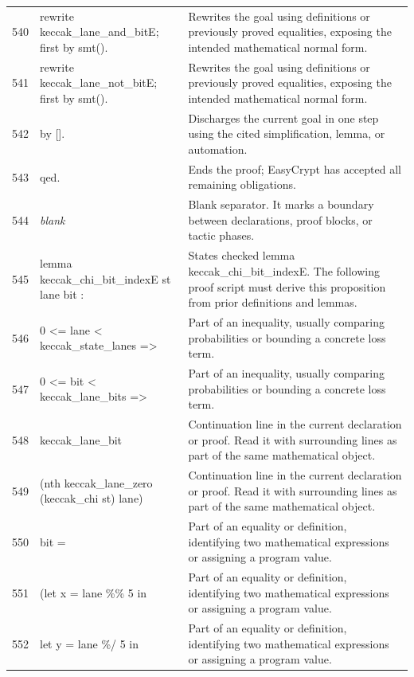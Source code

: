 \documentclass[10pt]{article}
\begin{document}
\begin{longtable}{r L{0.53\textwidth} L{0.37\textwidth}}
540 & {\ttfamily\scriptsize rewrite keccak\_lane\_and\_bitE; first by smt().} & Rewrites the goal using definitions or previously proved equalities, exposing the intended mathematical normal form. \\
541 & {\ttfamily\scriptsize rewrite keccak\_lane\_not\_bitE; first by smt().} & Rewrites the goal using definitions or previously proved equalities, exposing the intended mathematical normal form. \\
542 & {\ttfamily\scriptsize by [].} & Discharges the current goal in one step using the cited simplification, lemma, or automation. \\
543 & {\ttfamily\scriptsize qed.} & Ends the proof; EasyCrypt has accepted all remaining obligations. \\
544 & {\ttfamily\scriptsize \emph{blank}} & Blank separator.  It marks a boundary between declarations, proof blocks, or tactic phases. \\
545 & {\ttfamily\scriptsize lemma keccak\_chi\_bit\_indexE st lane bit :} & States checked lemma keccak\_chi\_bit\_indexE.  The following proof script must derive this proposition from prior definitions and lemmas. \\
546 & {\ttfamily\scriptsize   0 <= lane < keccak\_state\_lanes =>} & Part of an inequality, usually comparing probabilities or bounding a concrete loss term. \\
547 & {\ttfamily\scriptsize   0 <= bit < keccak\_lane\_bits =>} & Part of an inequality, usually comparing probabilities or bounding a concrete loss term. \\
548 & {\ttfamily\scriptsize   keccak\_lane\_bit} & Continuation line in the current declaration or proof.  Read it with surrounding lines as part of the same mathematical object. \\
549 & {\ttfamily\scriptsize     (nth keccak\_lane\_zero (keccak\_chi st) lane)} & Continuation line in the current declaration or proof.  Read it with surrounding lines as part of the same mathematical object. \\
550 & {\ttfamily\scriptsize     bit =} & Part of an equality or definition, identifying two mathematical expressions or assigning a program value. \\
551 & {\ttfamily\scriptsize   (let x = lane \%\% 5 in} & Part of an equality or definition, identifying two mathematical expressions or assigning a program value. \\
552 & {\ttfamily\scriptsize    let y = lane \%/ 5 in} & Part of an equality or definition, identifying two mathematical expressions or assigning a program value. \\

\end{longtable}
\end{document}
